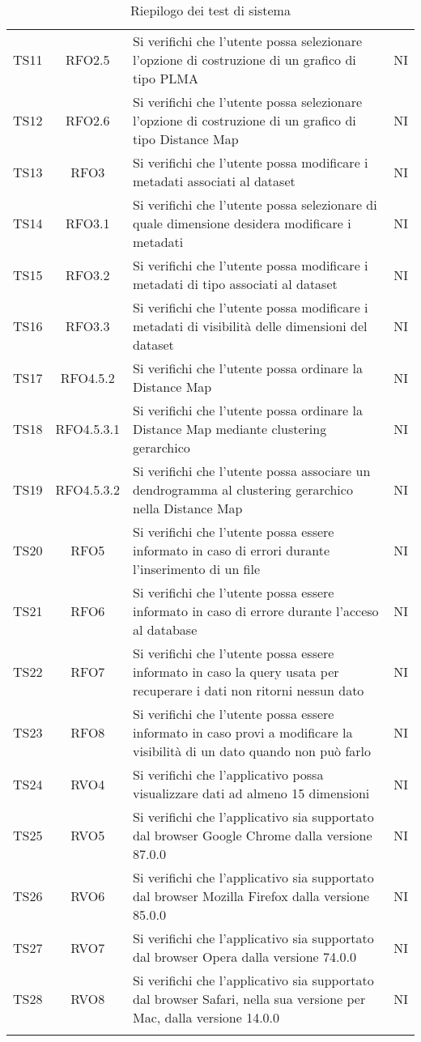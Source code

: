 \documentclass[../piano_di_qualifica.tex]{subfiles}
\begin{document}
\begin{center}
\begin{longtable}{|c|c|p{8cm}|c|}
		TS11  & RFO2.5     		& Si verifichi che l'utente possa selezionare l'opzione di costruzione di un grafico di tipo PLMA & NI \\
		TS12  & RFO2.6     		& Si verifichi che l'utente possa selezionare l'opzione di costruzione di un grafico di tipo Distance Map & NI \\
		TS13  & RFO3     		& Si verifichi che l'utente possa modificare i metadati associati al dataset & NI \\
		TS14  & RFO3.1     		& Si verifichi che l'utente possa selezionare di quale dimensione desidera modificare i metadati & NI \\
		TS15  & RFO3.2     		& Si verifichi che l'utente possa modificare i metadati di tipo associati al dataset & NI \\
		TS16  & RFO3.3     		& Si verifichi che l'utente possa modificare i metadati di visibilità delle dimensioni del dataset & NI \\
		TS17  & RFO4.5.2     	& Si verifichi che l'utente possa ordinare la Distance Map & NI \\
		TS18  & RFO4.5.3.1     	& Si verifichi che l'utente possa ordinare la Distance Map mediante clustering gerarchico & NI \\
		
		TS19  & RFO4.5.3.2   	& Si verifichi che l'utente possa associare un dendrogramma al clustering gerarchico nella Distance Map & NI \\
		TS20  & RFO5     		& Si verifichi che l'utente possa essere informato in caso di errori durante l'inserimento di un file & NI \\
		TS21  & RFO6     		& Si verifichi che l'utente possa essere informato in caso di errore durante l'acceso al database & NI \\
		TS22  & RFO7     		& Si verifichi che l'utente possa essere informato in caso la query usata per recuperare i dati non ritorni nessun dato & NI \\
		TS23  & RFO8    		& Si verifichi che l'utente possa essere informato in caso provi a modificare la visibilità di un dato quando non può farlo & NI \\
		
		TS24  &  RVO4    		& Si verifichi che l'applicativo possa visualizzare dati ad almeno 15 dimensioni & NI \\
		TS25  & RVO5    		& Si verifichi che l'applicativo sia supportato dal browser Google Chrome dalla versione 87.0.0 & NI \\
		TS26  & RVO6        	& Si verifichi che l'applicativo sia supportato dal browser Mozilla Firefox dalla versione 85.0.0  & NI \\
		TS27  & RVO7        	& Si verifichi che l'applicativo sia supportato dal browser Opera dalla versione 74.0.0  & NI \\
		TS28  & RVO8      		& Si verifichi che l'applicativo sia supportato dal browser Safari, nella sua versione per Mac, dalla versione 14.0.0  & NI \\
		\hline
		\rowcolor{white}
		\caption{Riepilogo dei test di sistema}
	\end{longtable}
\end{center}
\end{document}
